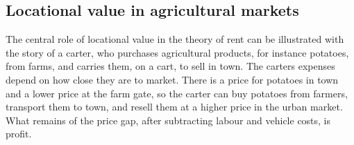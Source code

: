 

\subsection{Locational value in agricultural markets}

The central role of locational value in the theory of \gls{rent} can be illustrated with the story of a carter, who purchases agricultural products, for instance potatoes, from farms, and carries them, on a cart, to sell in town. 
The carters expenses depend on how close they are to market. %
There is a price for potatoes in town and a lower price at the farm gate, so the carter can buy potatoes from farmers, transport them to town, and resell them at a higher price in the urban market. What remains of the price gap, after subtracting labour and vehicle costs, is profit.  

